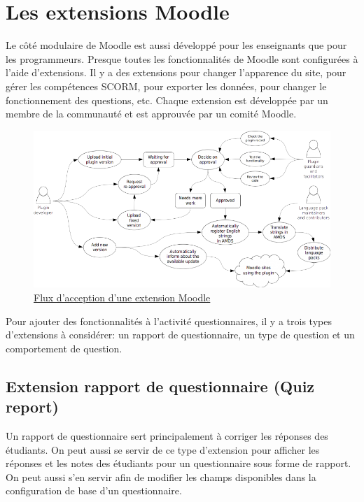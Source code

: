 \chapter{Les extensions Moodle}

Le côté modulaire de Moodle est aussi développé pour les enseignants que pour les programmeurs.
Presque toutes les fonctionnalités de Moodle sont configurées à l'aide d'extensions.
Il y a des extensions pour changer l'apparence du site, pour gérer les compétences SCORM, pour exporter les données, pour changer le fonctionnement des questions, etc.
Chaque extension est développée par un membre de la communauté et est approuvée par un comité Moodle.

\begin{figure}[h!]
  \includegraphics[scale=0.7]{images/plugin-contribution-workflow.png}
  \caption{\href{https://docs.moodle.org/dev/Plugin_contribution}{Flux d'acception d'une extension Moodle}}
\end{figure}

Pour ajouter des fonctionnalités à l'activité questionnaires, il y a trois types d'extensions à considérer: un rapport de questionnaire, un type de question et un comportement de question.

\section{Extension rapport de questionnaire (Quiz report)}

Un rapport de questionnaire sert principalement à corriger les réponses des étudiants.
On peut aussi se servir de ce type d'extension pour afficher les réponses et les notes des étudiants pour un questionnaire sous forme de rapport.
On peut aussi s'en servir afin de modifier les champs disponibles dans la configuration de base d'un questionnaire.

